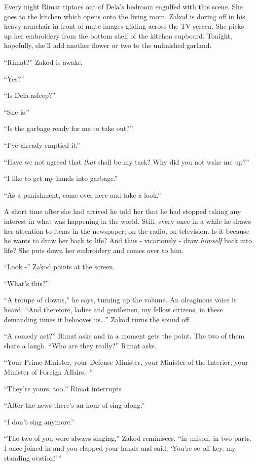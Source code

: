 \documentclass[twoside,11pt]{book}
\begin{document}
Every night Rimat tiptoes out of Dela's bedroom engulfed with this scene. She goes to the kitchen which opens onto the
living room. Zakod is dozing off in his heavy armchair in front of mute images gliding across the TV screen. She
picks up her embroidery from the bottom shelf of the kitchen cupboard. Tonight, hopefully, she'll add another flower or
two to the unfinished garland.

``Rimat?'' Zakod is awake.

``Yes?''

``Is Dela asleep?''

``She is.''

``Is the garbage ready for me to take out?''

``I've already emptied it.''

``Have we not agreed that \textit{that} shall be my task? Why did you not wake me up?''

``I like to get my hands into garbage.''

``As a punishment, come over here and take a look.''

A short time after she had arrived he told her that he had stopped taking any interest in what was happening in the
world. Still, every once in a while he draws her attention to items in the newspaper, on the radio, on television. Is
it because he wants to draw her back to life? And thus - vicariously - draw \textit{himself} back into life? She puts
down her embroidery and comes over to him.

``Look -'' Zakod points at the screen.

``What's this?''

``A troupe of clowns,'' he says, turning up the volume. An oleaginous voice is heard,
``And therefore, ladies and gentlemen, my fellow citizens, in these demanding times it behooves
us{\dots}'' Zakod turns the sound off.

``A comedy act?'' Rimat asks and in a moment gets the point. The two of them share a laugh.
``Who are they really?'' Rimat asks.

``Your Prime Minister, your Defense Minister, your Minister of the Interior, your Minister of Foreign
Affairs.--''

``They're yours, too,'' Rimat interrupts

``After the news there's an hour of sing-along.''

``I don't sing anymore.''

``The two of you were always singing,'' Zakod reminisces, ``in unison, in two
parts. I once joined in and you clapped your hands and said, {`You're so off key, my standing ovation!'}''
\end{document}
